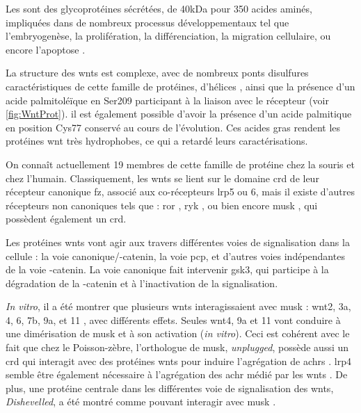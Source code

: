 	Les  sont des glycoprotéines sécrétées, de 40kDa pour 350 acides aminés, impliquées dans de nombreux processus développementaux tel que l'embryogenèse, la prolifération, la différenciation, la migration cellulaire, ou encore l'apoptose \cite{Miller2002, Willert2012}. 
	
	La structure des \Glspl{wnt} est complexe, avec  de nombreux ponts disulfures caractéristiques de cette famille de protéines, d'hélices \textalpha{}, ainsi que la présence d'un acide palmitoléïque en Ser209 \cite{Takada2006} participant à la liaison avec le récepteur (voir \cref{fig:WntProt}). il est également possible d'avoir la présence d'un acide palmitique en position Cys77 \cite{Takada2006} conservé au cours de l'évolution. Ces acides gras rendent les protéines \Gls{wnt} très hydrophobes, ce qui a retardé leurs caractérisations.
	
	On connaît actuellement 19 membres de cette famille de protéine chez la souris et chez l'humain. Classiquement, les \Glspl{wnt} se lient sur le domaine \gls{crd} de leur récepteur canonique \gls{fz}, associé aux co-récepteurs \gls{lrp}5 ou 6, mais il existe d'autres récepteurs non canoniques tels que : \gls{ror} \cite{Cadigan2006, Gordon2006, Green2008}, \gls{ryk} \cite{Bovolenta2006, Fradkin2010}, ou bien encore \gls{musk} \cite{Jing2009}, qui possèdent également un \gls{crd}.
	
	Les protéines \glspl{wnt} vont agir aux travers différentes voies de signalisation dans la cellule : la voie canonique/\textbeta{}-catenin, la voie \gls{pcp}, et d'autres voies indépendantes de la voie \textbeta{}-catenin. La voie canonique fait intervenir \gls{gsk3}, qui participe à la dégradation de la \textBeta{}-catenin et à l'inactivation de la signalisation. 
	
	\emph{In vitro}, il a été montrer que plusieurs \Glspl{wnt} interagissaient avec \gls{musk} : \Gls{wnt}2, 3a, 4, 6, 7b, 9a, et 11 \cite{Strochlic2012, Zhang2012, Barik2014}, avec différents effets. Seules \gls{wnt}4, 9a et 11 vont conduire à une dimérisation de \gls{musk} et à son activation (\emph{in vitro}). Ceci est cohérent avec le fait que chez le Poisson-zèbre, l'orthologue de \gls{musk}, \emph{unplugged}, possède aussi un \gls{crd} qui interagit avec des protéines \Glspl{wnt} pour induire l'agrégation de \glspl{achr} \cite{Jing2009, Gordon2012}. \Gls{lrp}4 semble être également nécessaire à l'agrégation des \gls{achr} médié par les \gls{wnt}s \cite{Zhang2012}. De plus, une protéine centrale dans les différentes voie de signalisation des \Glspl{wnt}, \emph{Dishevelled}, a été montré comme pouvant interagir avec \gls{musk} \cite{Luo2002}.


